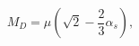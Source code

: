 \begin{equation}                              
M_{D}= \mu (\sqrt{2} - \frac{2}{3} \alpha_{s}),                \label{eq:dq}           
\end{equation} 
